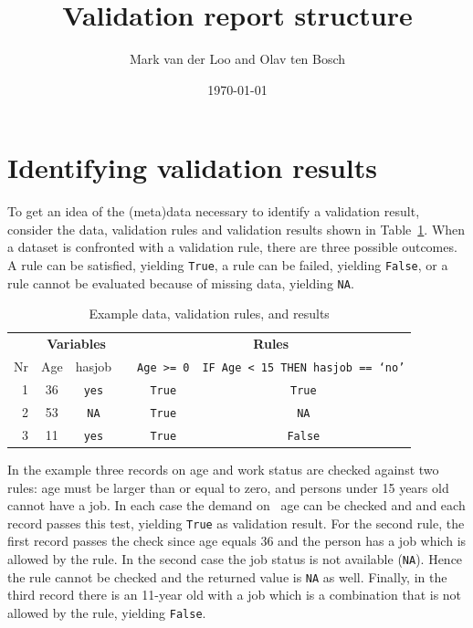 \documentclass[a4paper, 11pt]{article}
\title{Validation report structure}
\author{Mark van der Loo and Olav ten Bosch}
\date{\today}
\newcommand{\code}[1]{\texttt{#1}}
\newcommand{\waar}{{\normalfont \texttt{True}}}
\newcommand{\onwaar}{{\normalfont \texttt{False}}}
\newcommand{\na}{{\normalfont \texttt{NA}}}
\begin{document}
\maketitle{}

\tableofcontents{}






\section{Identifying validation results}
To get an idea of the (meta)data necessary to identify a validation result,
consider the data, validation rules and validation results shown in
Table~\ref{tab:example1}. When a dataset is confronted with a validation rule,
there are three possible outcomes. A rule can be satisfied, yielding \waar{}, a
rule can be failed, yielding \onwaar{}, or a rule cannot be evaluated because
of missing data, yielding \na{}.
%
\begin{table}
\centering
\caption{Example data, validation rules, and results}
\begin{tabular}{rccccb{4cm}}
\hline
&\multicolumn{2}{c}{\textbf{Variables}}&&\multicolumn{2}{c}{\textbf{Rules}}\\
Nr  & Age  & hasjob     && \code{Age >= 0} & \code{IF Age < 15 THEN hasjob == `no'}\\
\cline{2-3}\cline{5-6}
1   & 36   & \code{yes} && \waar{}        & \multicolumn{1}{c}{\waar{}}\\
2   & 53   & \code{NA}  && \waar{}        & \multicolumn{1}{c}{\na{}}\\
3   & 11   & \code{yes} && \waar{}        & \multicolumn{1}{c}{\onwaar{}}\\
\hline
\end{tabular}
\label{tab:example1}
\end{table}



In the example three records on age and work status are checked against two
rules: age must be larger than or equal to zero, and persons under 15 years old
cannot have a job. In each case the demand on  age can be checked and and each
record passes this test, yielding \waar{} as validation result. For the second
rule, the first record passes the check since age equals 36 and the person has
a job which is allowed by the rule. In the second case the job status is not
available (\na{}). Hence the rule cannot be checked and the returned value is \na{}
as well. Finally, in the third record there is an 11-year old with a job which
is a combination that is not allowed by the rule, yielding \onwaar{}.
\end{document}

